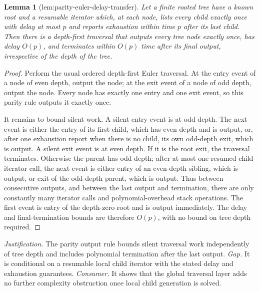 \documentclass{article}
\newtheorem{lemma}{Lemma}
\begin{document}
\begin{lemma}[lem:parity-euler-delay-transfer]\label{lem:parity-euler-delay-transfer}
Let a finite rooted tree have a known root and a resumable iterator which, at each node, lists every child exactly once with delay at most \(p\) and reports exhaustion within time \(p\) after its last child. Then there is a depth-first traversal that outputs every tree node exactly once, has delay \(O(p)\), and terminates within \(O(p)\) time after its final output, irrespective of the depth of the tree.
\end{lemma}
\begin{proof}
Perform the usual ordered depth-first Euler traversal. At the entry event of a node of even depth, output the node; at the exit event of a node of odd depth, output the node. Every node has exactly one entry and one exit event, so this parity rule outputs it exactly once.

It remains to bound silent work. A silent entry event is at odd depth. The next event is either the entry of its first child, which has even depth and is output, or, after one exhaustion report when there is no child, its own odd-depth exit, which is output. A silent exit event is at even depth. If it is the root exit, the traversal terminates. Otherwise the parent has odd depth; after at most one resumed child-iterator call, the next event is either entry of an even-depth sibling, which is output, or exit of the odd-depth parent, which is output. Thus between consecutive outputs, and between the last output and termination, there are only constantly many iterator calls and polynomial-overhead stack operations. The first event is entry of the depth-zero root and is output immediately. The delay and final-termination bounds are therefore \(O(p)\), with no bound on tree depth required.
\end{proof}
\par\smallskip\noindent \textit{Justification.} The parity output rule bounds silent traversal work independently of tree depth and includes polynomial termination after the last output. \textit{Gap.} It is conditional on a resumable local child iterator with the stated delay and exhaustion guarantees. \textit{Consumer.} It shows that the global traversal layer adds no further complexity obstruction once local child generation is solved.
\end{document}
